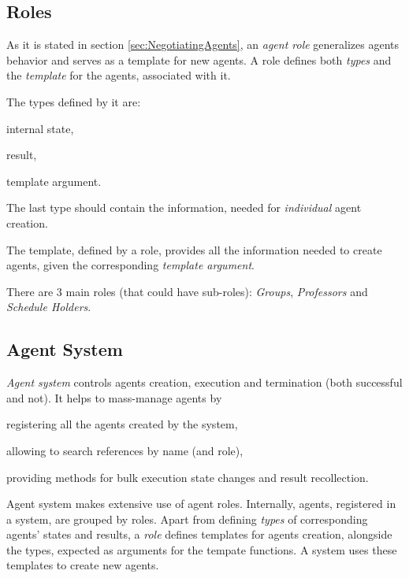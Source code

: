 \documentclass[../header]{subfiles}
\begin{document}
\subsection{Roles}

As it is stated in section \ref{sec:NegotiatingAgents}, an \emph{agent role}
generalizes agents behavior and serves as a template for new agents.
A role defines both \emph{types} and the \emph{template} for the agents, associated with it.

The types defined by it are:
  \begin{enumerate*}[1)]
    \item internal state,
    \item result,
    \item template argument.
  \end{enumerate*}
The last type should contain the information, needed for \emph{individual} agent creation.

The template, defined by a role, provides all the information needed to create agents,
given the corresponding \emph{template argument}.

\bigskip\noindent
There are 3 main roles (that could have sub-roles): \emph{Groups},
\emph{Professors} and \emph{Schedule Holders}.

\subsection{Agent System}

\emph{Agent system} controls agents creation, execution and termination
(both successful and not).
It helps to mass-manage agents by
\begin{enumerate*}[1)]
  \item registering all the agents created by the system,
  \item allowing to search references by name (and role),
  \item providing methods for bulk execution state changes and result recollection.
\end{enumerate*}


Agent system makes extensive use of agent roles. Internally, agents,
registered in a system, are grouped by roles.
Apart from defining \emph{types} of corresponding agents' states and results,
a \emph{role} defines templates for agents creation, alongside the types, expected
as arguments for the tempate functions.
A system uses these templates to create new agents.
\end{document}
